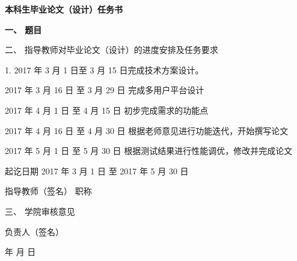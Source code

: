 {
  \setlength{\parindent}{0em}
  \linespread{1}

  \vspace*{-2.2em}

  {
    \centering
    \songti\erhao\bfseries
    本科生毕业论文（设计）任务书 \par
  }

  \vspace{2.1em}

  {
    \renewcommand\arraystretch{1.7}
    \songti\xiaosi\bfseries
    一、 \; 题目 \; \underline{\makebox{\zjutitlec}}

    \vspace{1.1em}

    二、 \; 指导教师对毕业论文（设计）的进度安排及任务要求

      1. 2017 年 3 月 1 日至 3 月 15 日完成技术方案设计。

      2017 年 3 月 16 日 至 3 月 29 日 完成多用户平台设计

      2017 年 4 月 1 日 至 4 月 15 日 初步完成需求的功能点

      2017 年 4 月 16 日 至 4 月 30 日 根据老师意见进行功能迭代，开始撰写论文

      2017 年 5 月 1 日 至 5 月 30 日 根据测试结果进行性能调优，修改并完成论文


    \vspace{2em}

    \hfill 起讫日期 \hspace{1em} 2017 年 \hspace{0.5em} 3 月 \hspace{0.5em} 1 日 \; 至 \hspace{0.5em} 2017 年 \hspace{0.5em} 5 月 \hspace{0.5em} 30 日

    \vspace{1.3em}

    \hfill 指导教师（签名） \; \underline{\hspace{4em}} \; 职称 \; \underline{\hspace{4em}}

    \vspace{2.35em}

    三、 \; 学院审核意见

    \vspace{13.95em}

    \hfill 负责人（签名） \; \underline{\hspace{4em}}

    \vspace{1.3em}

    \hfill \hspace{2em} 年 \hspace{1em} 月 \hspace{1em} 日 \par
  }
}
